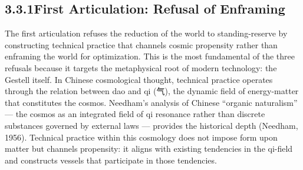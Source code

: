 \subsection{3.3.1\quad First Articulation: Refusal of Enframing}

The first articulation refuses the reduction of the world to standing-reserve by constructing technical practice that channels cosmic propensity rather than enframing the world for optimization. This is the most fundamental of the three refusals because it targets the metaphysical root of modern technology: the Gestell itself. In Chinese cosmological thought, technical practice operates through the relation between dao and qi (气), the dynamic field of energy-matter that constitutes the cosmos. Needham’s analysis of Chinese “organic naturalism” — the cosmos as an integrated field of qi resonance rather than discrete substances governed by external laws — provides the historical depth (Needham, 1956). Technical practice within this cosmology does not impose form upon matter but channels propensity: it aligns with existing tendencies in the qi-field and constructs vessels that participate in those tendencies.

